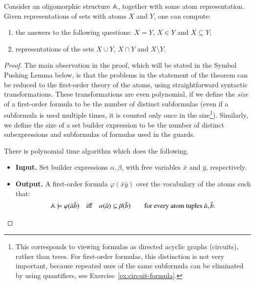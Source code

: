 \begin{theorem}\label{thm:decide-set-builder}
	Consider an  oligomorphic structure $\mathbb A$, together with some atom representation. Given representations of  sets with atoms $X$ and $Y$, one can compute:
	\begin{enumerate}
		\item the answers to the following questions: $X = Y$, $X \in Y$ and $X \subseteq Y$;
		\item representations of the sets $X \cup Y$, $X \cap Y$ and $X \setminus Y$.
	\end{enumerate}
\end{theorem}
\begin{proof}
	The main observation in the proof, which will be stated in the Symbol Pushing Lemma below, is that the problems in the statement of the theorem can be reduced to the first-order theory of the atoms, using straightforward syntactic transformations. These transformations are even polynomial, if we define the \emph{size} of a first-order formula to be the number of distinct subformulas (even if a subformula is used multiple times, it is counted only once in the size\footnote{This corresponds to viewing formulas as directed acyclic graphs (circuits), rather than trees. For first-order formulas, this distinction is not very important, because repeated uses of the same subformula can be eliminated by using quantifiers, see Exercise~\ref{ex:circuit-formula}. }). Similarly, we define the size of a set builder expression to be the number of distinct subexpressions and subformulas of formulas used in the guards. 


\begin{lemma}\label{lem:symbol-pushing}  There is polynomial time algorithm which does the following.
	\begin{itemize}
		\item {\bf Input.} Set builder expressions $\alpha, \beta$, with free variables $\bar x$ and $\bar y$, respectively.
		\item {\bf Output.} A first-order formula $\varphi(\bar x \bar y)$ over the vocabulary of the atoms such that:
		\begin{align*}
			\mathbb A \models \varphi(\bar a \bar b) \quad \text{iff} \quad \alpha (\bar a) \subseteq \beta (\bar b) \qquad \text{for every atom tuples $\bar a, \bar b$.}
		\end{align*}
	\end{itemize}
		 

\end{lemma}
\end{proof}
